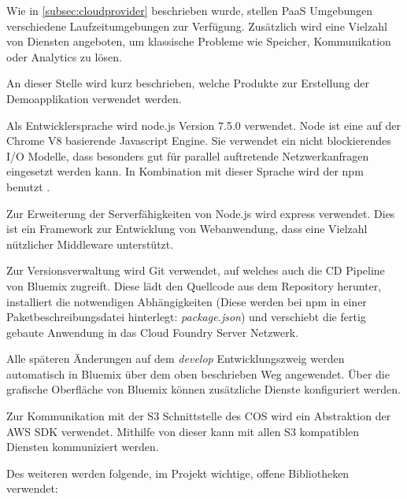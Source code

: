 Wie in \autoref{subsec:cloudprovider} beschrieben wurde, stellen \acs{PaaS} Umgebungen verschiedene Laufzeitumgebungen zur Verfügung. Zusätzlich wird eine Vielzahl von Diensten angeboten, um klassische Probleme wie Speicher, Kommunikation oder Analytics zu lösen.

An dieser Stelle wird kurz beschrieben, welche Produkte zur Erstellung der Demoapplikation verwendet werden. 

Als Entwicklersprache wird node.js Version 7.5.0 verwendet. Node ist eine auf der Chrome V8 basierende Javascript Engine. Sie verwendet ein nicht blockierendes I/O Modelle, dass besonders gut für parallel auftretende Netzwerkanfragen eingesetzt werden kann. In Kombination mit dieser Sprache wird der \ac{npm} benutzt \parencite{nodejs.2017}.

Zur Erweiterung der Serverfähigkeiten von Node.js wird express verwendet. Dies ist ein Framework zur Entwicklung von Webanwendung, dass eine Vielzahl nützlicher Middleware unterstützt.

Zur Versionsverwaltung wird \gls{Git} verwendet, auf welches auch die \ac{CD} Pipeline von Bluemix zugreift. Diese lädt den Quellcode aus dem Repository herunter, installiert die notwendigen Abhängigkeiten (Diese werden bei \acs{npm} in einer Paketbeschreibungsdatei hinterlegt: \textit{package.json}) und verschiebt die fertig gebaute Anwendung in das Cloud Foundry Server Netzwerk.  

Alle späteren Änderungen auf dem \textit{develop} Entwicklungszweig werden automatisch in Bluemix über dem oben beschrieben Weg angewendet. Über die grafische Oberfläche von Bluemix können zusätzliche Dienste konfiguriert werden.

Zur Kommunikation mit der S3 Schnittstelle des \acs{COS} wird ein Abstraktion der \acs{AWS} \gls{SDK} verwendet. Mithilfe von dieser kann mit allen \acs{S3} kompatiblen Diensten kommuniziert werden.

Des weiteren werden folgende, im Projekt wichtige, offene Bibliotheken verwendet:

